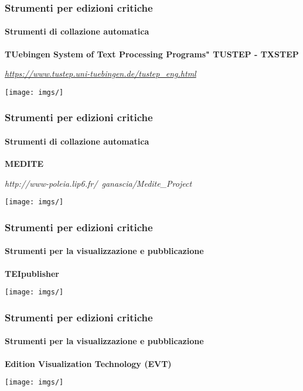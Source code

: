 \begin{frame}
    \frametitle{Strumenti per edizioni critiche}
    \framesubtitle{Strumenti di collazione automatica}
	\addtocounter{nframe}{1}
    \begin{center}
        \textbf{TUebingen System of Text Processing Programs" TUSTEP - TXSTEP}
    \end{center}
    \begin{center}
        \textit{\url{https://www.tustep.uni-tuebingen.de/tustep_eng.html}}
	\end{center}
    \begin{center}
        \texttt{[image: imgs/]}
	\end{center}
\end{frame}

\begin{frame}
    \frametitle{Strumenti per edizioni critiche}
    \framesubtitle{Strumenti di collazione automatica}
	\addtocounter{nframe}{1}
    \begin{center}
        \textbf{MEDITE}
    \end{center}
    \begin{center}
        \textit{http://www-poleia.lip6.fr/~ganascia/Medite_Project}
	\end{center}
    \begin{center}
        \texttt{[image: imgs/]}
	\end{center}
\end{frame}





\begin{frame}
    \frametitle{Strumenti per edizioni critiche}
    \framesubtitle{Strumenti per la visualizzazione e pubblicazione}
	\addtocounter{nframe}{1}
    \begin{center}
        \textbf{TEIpublisher}
    \end{center}
    \begin{center}
        \textit{}
	\end{center}
    \begin{center}
        \texttt{[image: imgs/]}
	\end{center}
\end{frame}

\begin{frame}
    \frametitle{Strumenti per edizioni critiche}
    \framesubtitle{Strumenti per la visualizzazione e pubblicazione}
	\addtocounter{nframe}{1}
    \begin{center}
        \textbf{Edition Visualization Technology (EVT)}
    \end{center}
    \begin{center}
        \textit{}
	\end{center}
    \begin{center}
        \texttt{[image: imgs/]}
	\end{center}
\end{frame}

